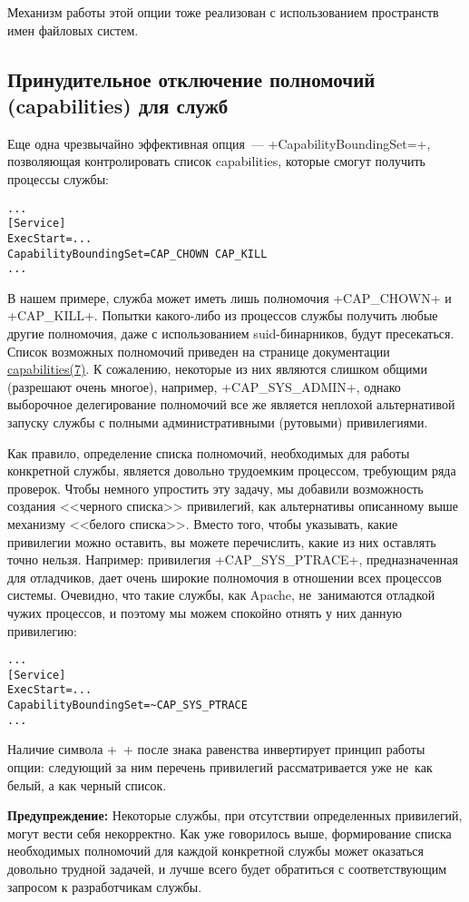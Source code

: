 \documentclass[10pt,oneside,a4paper]{article}
\newenvironment{caveat}[1][]{\smallskip\par\textbf{Предупреждение#1: }}%
	{\smallskip\par}
\begin{document}
Механизм работы этой опции тоже реализован с использованием пространств имен
файловых систем.

\subsection{Принудительное отключение полномочий (capabilities) для служб}

Еще одна чрезвычайно эффективная опция~--- +CapabilityBoundingSet=+, позволяющая
контролировать список capabilities, которые смогут получить процессы службы:
\begin{Verbatim}
...
[Service]
ExecStart=...
CapabilityBoundingSet=CAP_CHOWN CAP_KILL
...
\end{Verbatim}
В нашем примере, служба может иметь лишь полномочия +CAP_CHOWN+ и +CAP_KILL+.
Попытки какого-либо из процессов службы получить любые другие полномочия, даже с
использованием suid-бинарников, будут пресекаться. Список возможных полномочий
приведен на странице документации
\href{http://linux.die.net/man/7/capabilities}{capabilities(7)}. К сожалению,
некоторые из них являются слишком общими (разрешают очень многое), например,
+CAP_SYS_ADMIN+, однако выборочное делегирование полномочий все же является
неплохой альтернативой запуску службы с полными административными (рутовыми)
привилегиями.

Как правило, определение списка полномочий, необходимых для работы конкретной
службы, является довольно трудоемким процессом, требующим ряда проверок. Чтобы
немного упростить эту задачу, мы добавили возможность создания <<черного
списка>> привилегий, как альтернативы описанному выше механизму <<белого
списка>>. Вместо того, чтобы указывать, какие привилегии можно оставить, вы
можете перечислить, какие из них оставлять точно нельзя. Например: привилегия
+CAP_SYS_PTRACE+, предназначенная для отладчиков, дает очень широкие полномочия
в отношении всех процессов системы. Очевидно, что такие службы, как Apache,
не~занимаются отладкой чужих процессов, и поэтому мы можем спокойно отнять у них
данную привилегию:
\begin{Verbatim}
...
[Service]
ExecStart=...
CapabilityBoundingSet=~CAP_SYS_PTRACE
...
\end{Verbatim}
Наличие символа +~+ после знака равенства инвертирует принцип работы опции:
следующий за ним перечень привилегий рассматривается уже не~как белый, а как
черный список.

\begin{caveat}
Некоторые службы, при отсутствии определенных привилегий, могут вести себя
некорректно. Как уже говорилось выше, формирование списка необходимых полномочий
для каждой конкретной службы может оказаться довольно трудной задачей, и лучше
всего будет обратиться с соответствующим запросом к разработчикам службы.
\end{caveat}
\end{document}
